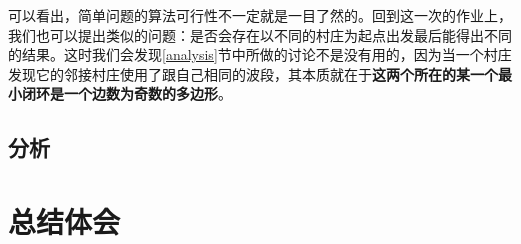 \documentclass[UTF8]{ctexart}
\begin{document}
 	\indent 可以看出，简单问题的算法可行性不一定就是一目了然的。回到这一次的作业上，我们也可以提出类似的问题：\textcolor[rgb]{0.8,0.1,0.1}{是否会存在以不同的村庄为起点出发最后能得出不同的结果}。这时我们会发现\ref{analysis}节中所做的讨论不是没有用的，因为当一个村庄发现它的邻接村庄使用了跟自己相同的波段，其本质就在于\textbf{这两个所在的某一个最小闭环是一个边数为奇数的多边形}。

	\subsection{分析}\label{time_of_PrintLots}
	

	\section{总结体会}
	


\end{document}
